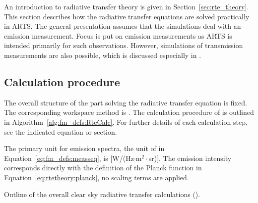 An introduction to radiative transfer theory is given in
Section~\ref{sec:rte_theory}. This section describes how the radiative
transfer equations are solved practically in ARTS. The general
presentation assumes that the simulations deal with an emission
measurement. Focus is put on emission measurements as ARTS is intended
primarily for such observations. However, simulations of transmission
measurements are also possible, which is discussed especially in
.


\subsection{Calculation procedure}
\label{sec:fm_defs:calcproc}

The overall structure of the part solving the radiative transfer
equation is fixed. The corresponding workspace method is
. The calculation procedure of  is
outlined in Algorithm~\ref{alg:fm_defs:RteCalc}. For further details
of each calculation step, see the indicated equation or section.

The primary unit for emission spectra, the unit of  in
Equation~\ref{eq:fm_defs:measseq}, is [W/(Hz$\cdot$m$^2\cdot$sr)].
The emission intensity corresponds directly with the definition of the
Planck function in Equation~\ref{eq:rtetheory:planck}, no scaling
terms are applied.  

\begin{algorithm}[!t]
 \begin{algorithmic}
   \ENDFOR
  \ENDFOR
 \end{algorithmic}
 \caption{Outline of the overall clear sky radiative transfer calculations
   ().}
 \label{alg:fm_defs:RteCalc}
\end{algorithm}


